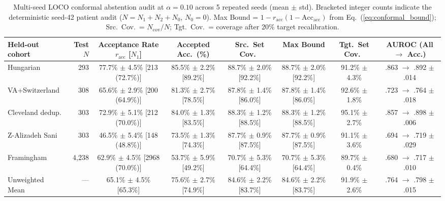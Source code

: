 \documentclass[journal]{IEEEtran}
\begin{document}
\begin{table}[t]
\caption{Multi-seed LOCO conformal abstention audit at $\alpha=0.10$ across 5 repeated seeds (mean $\pm$ std). Bracketed integer counts indicate the deterministic seed-42 patient audit ($N = N_1 + N_2 + N_0$, $N_0=0$). Max Bound = $1 - r_{\mathrm{acc}}(1 - \mathrm{Acc}_{\mathrm{acc}})$ from Eq.~(\ref{eq:conformal_bound}); Src.\ Cov.\ = $N_{\mathrm{cov}}/N$; Tgt.\ Cov.\ = coverage after 20\% target recalibration.}
\label{tab:conf}
\centering\footnotesize
\setlength{\tabcolsep}{3.5pt}
\begin{tabular}{lrcccccc}
\toprule
Held-out cohort & Test $N$ & Acceptance Rate $r_{\mathrm{acc}}$ [$N_1$] & Accepted Acc.\ (\%) & Src.\ Set Cov.\ & Max Bound & Tgt.\ Set Cov.\ & AUROC (All $\rightarrow$ Acc.)\\
\midrule
Hungarian & 293 & 77.7\% $\pm$ 4.5\% [213 (72.7\%)] & 85.5\% $\pm$ 2.2\% [89.2\%] & 88.7\% $\pm$ 2.0\% [92.2\%] & 88.7\% $\pm$ 2.0\% [92.2\%] & 91.2\% $\pm$ 4.3\% & .863 $\rightarrow$ .892 $\pm$ .014\\
VA+Switzerland & 308 & 65.6\% $\pm$ 2.9\% [200 (64.9\%)] & 81.3\% $\pm$ 2.7\% [78.5\%] & 87.8\% $\pm$ 1.4\% [86.0\%] & 87.8\% $\pm$ 1.4\% [86.0\%] & 92.6\% $\pm$ 1.8\% & .723 $\rightarrow$ .764 $\pm$ .018\\
Cleveland dedup. & 303 & 72.9\% $\pm$ 5.1\% [212 (70.0\%)] & 84.0\% $\pm$ 1.3\% [83.5\%] & 88.3\% $\pm$ 1.2\% [88.5\%] & 88.3\% $\pm$ 1.2\% [88.5\%] & 95.1\% $\pm$ 2.7\% & .857 $\rightarrow$ .898 $\pm$ .006\\
Z-Alizadeh Sani & 303 & 46.5\% $\pm$ 5.4\% [148 (48.8\%)] & 73.5\% $\pm$ 1.3\% [74.3\%] & 87.7\% $\pm$ 0.9\% [87.5\%] & 87.7\% $\pm$ 0.9\% [87.5\%] & 91.1\% $\pm$ 3.6\% & .694 $\rightarrow$ .719 $\pm$ .029\\
Framingham & 4{,}238 & 62.9\% $\pm$ 4.5\% [2968 (70.0\%)] & 53.7\% $\pm$ 5.9\% [49.2\%] & 70.7\% $\pm$ 5.3\% [64.4\%] & 70.7\% $\pm$ 5.3\% [64.4\%] & 89.7\% $\pm$ 0.4\% & .680 $\rightarrow$ .717 $\pm$ .010\\
\midrule
Unweighted Mean & --- & 65.1\% $\pm$ 4.5\% [65.3\%] & 75.6\% $\pm$ 2.7\% [74.9\%] & 84.6\% $\pm$ 2.2\% [83.7\%] & 84.6\% $\pm$ 2.2\% [83.7\%] & 91.9\% $\pm$ 2.6\% & .764 $\rightarrow$ .798 $\pm$ .015\\
\bottomrule
\end{tabular}
\end{table}
\end{document}
